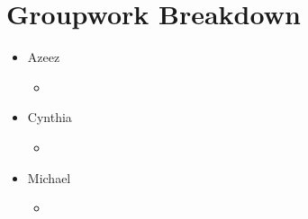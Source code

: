 \documentclass{article}
\begin{document}
\section{Groupwork Breakdown}
\begin{itemize}
    \item Azeez
          \begin{itemize}
              \item
          \end{itemize}
    \item Cynthia
          \begin{itemize}
              \item
          \end{itemize}
    \item Michael
          \begin{itemize}
              \item
          \end{itemize}
\end{itemize}



\end{document}
